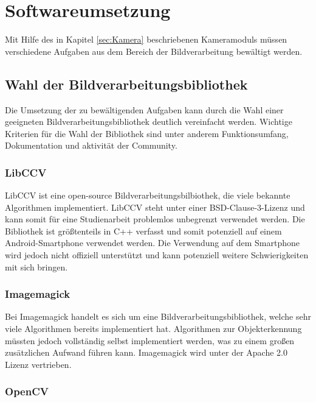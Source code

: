 \chapter{Softwareumsetzung}
\label{cha:Software}

Mit Hilfe des in Kapitel \ref{sec:Kamera} beschriebenen Kameramoduls müssen verschiedene Aufgaben aus dem Bereich der Bildverarbeitung bewältigt werden. 

\section{Wahl der Bildverarbeitungsbibliothek}

Die Umsetzung der zu bewältigenden Aufgaben kann durch die Wahl einer geeigneten Bildverarbeitungsbibliothek deutlich vereinfacht werden. Wichtige Kriterien für die Wahl der Bibliothek sind unter anderem Funktionsumfang, Dokumentation und aktivität der Community.

\subsection{LibCCV}

LibCCV \cite{libccv} ist eine open-source Bildverarbeitungsbilbiothek, die viele bekannte Algorithmen implementiert. LibCCV steht unter einer BSD-Clause-3-Lizenz und kann somit für eine Studienarbeit problemlos unbegrenzt verwendet werden. Die Bibliothek ist größtenteils in C++ verfasst und somit potenziell auf einem Android-Smartphone verwendet werden. Die Verwendung auf dem Smartphone wird jedoch nicht offiziell unterstützt und kann potenziell weitere Schwierigkeiten mit sich bringen.

\subsection{Imagemagick}

Bei Imagemagick \cite{imagemagick} handelt es sich um eine Bildverarbeitungsbibliothek, welche sehr viele Algorithmen bereits implementiert hat. Algorithmen zur Objekterkennung müssten jedoch vollständig selbst implementiert werden, was zu einem großen zusätzlichen Aufwand führen kann. Imagemagick wird unter der Apache 2.0 Lizenz vertrieben.

\subsection{OpenCV}
\label{subsec:opencv}

